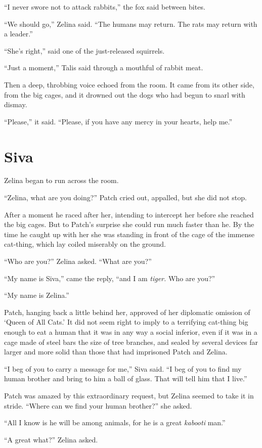 \documentclass[ebook,oneside,openany,17pt]{memoir}
\renewcommand{\thechapter}{\Roman{chapter}}
\newcounter{sections}
\newcommand{\sections}[1]{%
  \section*{#1}
  \addtocounter{sections}{1}%
  \pdfbookmark[1]{#1}{section.\thechapter.\thesections}}
\begin{document}
“I never swore not to attack rabbits,” the fox said between bites.

“We should go,” Zelina said. “The humans may return. The rats may
return with a leader.”

“She’s right,” said one of the just-released squirrels.

“Just a moment,” Talis said through a mouthful of rabbit meat.

Then a deep, throbbing voice echoed from the room. It came from its
other side, from the big cages, and it drowned out the dogs who had
begun to snarl with dismay.

“Please,” it said. “Please, if you have any mercy in your hearts, help
me.”


\sections{Siva}

Zelina began to run across the room.

“Zelina, what are you doing?” Patch cried out, appalled, but she did
not stop.

After a moment he raced after her, intending to intercept her before
she reached the big cages. But to Patch’s surprise she could run much
faster than he. By the time he caught up with her she was standing in
front of the cage of the immense cat-thing, which lay coiled miserably
on the ground.

“Who are you?” Zelina asked. “What are you?”

“My name is Siva,” came the reply, “and I am \emph{tiger.} Who are
you?”

“My name is Zelina.”

Patch, hanging back a little behind her, approved of her diplomatic
omission of ‘Queen of All Cats.’ It did not seem right to imply to a
terrifying cat-thing big enough to eat a human that it was in any way
a social inferior, even if it was in a cage made of steel bars the
size of tree branches, and sealed by several devices far larger and
more solid than those that had imprisoned Patch and Zelina.

“I beg of you to carry a message for me,” Siva said. “I beg of you to
find my human brother and bring to him a ball of glass. That will tell
him that I live.”

Patch was amazed by this extraordinary request, but Zelina seemed to
take it in stride. “Where can we find your human brother?” she asked.

“All I know is he will be among animals, for he is a great
\emph{kabooti} man.”

“A great what?” Zelina asked.
\end{document}
